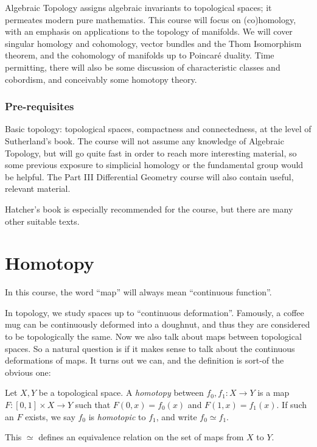 \documentclass[a4paper]{article}
\theoremstyle{definition}
\begin{document}
\maketitle
{\small
\setlength{\parindent}{0em}
\setlength{\parskip}{1em}

Algebraic Topology assigns algebraic invariants to topological spaces; it permeates modern pure mathematics. This course will focus on (co)homology, with an emphasis on applications to the topology of manifolds. We will cover singular homology and cohomology, vector bundles and the Thom Isomorphism theorem, and the cohomology of manifolds up to Poincar\'e duality. Time permitting, there will also be some discussion of characteristic classes and cobordism, and conceivably some homotopy theory.

\subsubsection*{Pre-requisites}

Basic topology: topological spaces, compactness and connectedness, at the level of Sutherland's book. The course will not assume any knowledge of Algebraic Topology, but will go quite fast in order to reach more interesting material, so some previous exposure to simplicial homology or the fundamental group would be helpful. The Part III Differential Geometry course will also contain useful, relevant material.

Hatcher's book is especially recommended for the course, but there are many other suitable texts.
}
\tableofcontents

\section{Homotopy}
In this course, the word ``map'' will always mean ``continuous function''.

In topology, we study spaces up to ``continuous deformation''. Famously, a coffee mug can be continuously deformed into a doughnut, and thus they are considered to be topologically the same. Now we also talk about maps between topological spaces. So a natural question is if it makes sense to talk about the continuous deformations of maps. It turns out we can, and the definition is sort-of the obvious one:

\begin{defi}[Homotopy]
  Let $X, Y$ be a topological space. A \emph{homotopy} between $f_0, f_1: X \to Y$ is a map $F: [0, 1] \times X \to Y$ such that $F(0, x) = f_0(x)$ and $F(1, x) = f_1(x)$. If such an $F$ exists, we say $f_0$ is \emph{homotopic} to $f_1$, and write $f_0 \simeq f_1$.

  This $\simeq$ defines an equivalence relation on the set of maps from $X$ to $Y$.
\end{defi}
\end{document}

